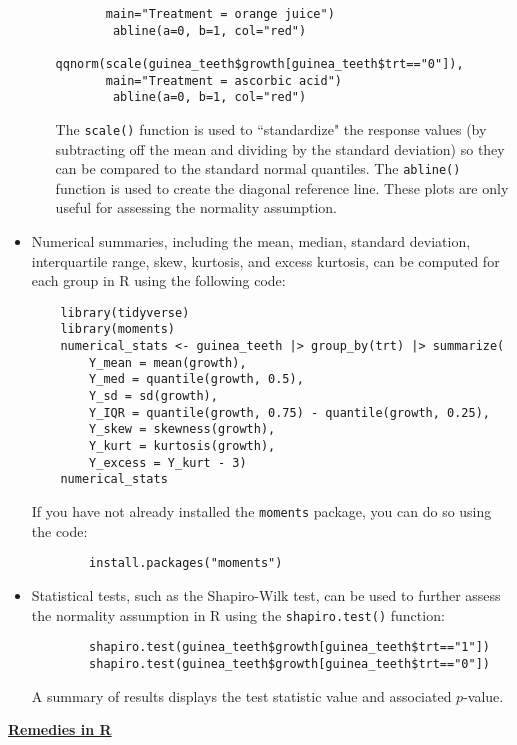\documentclass[11pt]{article}
\begin{document}
\begin{itemize}
\begin{enumerate}
\begin{verbatim}
       main="Treatment = orange juice")
		abline(a=0, b=1, col="red")
		qqnorm(scale(guinea_teeth$growth[guinea_teeth$trt=="0"]),
       main="Treatment = ascorbic acid")
		abline(a=0, b=1, col="red")
		\end{verbatim}
		The \texttt{scale()} function is used to ``standardize" the response values (by subtracting off the mean and dividing by the standard deviation) so they can be compared to the standard normal quantiles.  The \texttt{abline()} function is used to create the diagonal reference line. These plots are only useful for assessing the normality assumption.
	\end{enumerate}
	\item Numerical summaries, including the mean, median, standard deviation, interquartile range, skew, kurtosis, and excess kurtosis, can be computed for each group in R using the following code:
	\begin{verbatim}
	library(tidyverse)
	library(moments)
	numerical_stats <- guinea_teeth |> group_by(trt) |> summarize(
	    Y_mean = mean(growth),
	    Y_med = quantile(growth, 0.5),
	    Y_sd = sd(growth),
	    Y_IQR = quantile(growth, 0.75) - quantile(growth, 0.25),
	    Y_skew = skewness(growth),
	    Y_kurt = kurtosis(growth),
	    Y_excess = Y_kurt - 3)
	numerical_stats
	\end{verbatim}
	If you have not already installed the \texttt{moments} package, you can do so using the code:
	\begin{verbatim}
		install.packages("moments")
	\end{verbatim}
	\item Statistical tests, such as the Shapiro-Wilk test, can be used to further assess the normality assumption in R using the \texttt{shapiro.test()} function:
	\begin{verbatim}
		shapiro.test(guinea_teeth$growth[guinea_teeth$trt=="1"])
		shapiro.test(guinea_teeth$growth[guinea_teeth$trt=="0"])
	\end{verbatim}
	A summary of results displays the test statistic value and associated $p$-value.
\end{itemize}

\vspace{1cm}

\textbf{\underline{Remedies in R}}
\end{document}
